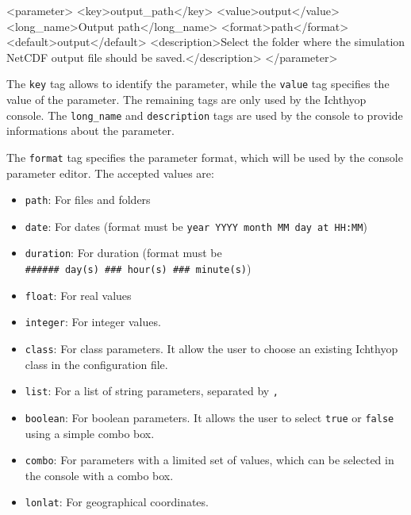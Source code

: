 \documentclass[
  letterpaper,
  DIV=11,
  numbers=noendperiod]{scrreprt}
\newenvironment{Shaded}{\begin{snugshade}}{\end{snugshade}}
\newcommand{\KeywordTok}[1]{\textcolor[rgb]{0.00,0.23,0.31}{#1}}
\newcommand{\NormalTok}[1]{\textcolor[rgb]{0.00,0.23,0.31}{#1}}
\providecommand{\tightlist}{%
  \setlength{\itemsep}{0pt}\setlength{\parskip}{0pt}}\usepackage{longtable,booktabs,array}
\begin{document}
\begin{Shaded}
\begin{Highlighting}[]
\NormalTok{\textless{}}\KeywordTok{parameter}\NormalTok{\textgreater{}}
\NormalTok{    \textless{}}\KeywordTok{key}\NormalTok{\textgreater{}output\_path\textless{}/}\KeywordTok{key}\NormalTok{\textgreater{}}
\NormalTok{    \textless{}}\KeywordTok{value}\NormalTok{\textgreater{}output\textless{}/}\KeywordTok{value}\NormalTok{\textgreater{}}
\NormalTok{    \textless{}}\KeywordTok{long\_name}\NormalTok{\textgreater{}Output path\textless{}/}\KeywordTok{long\_name}\NormalTok{\textgreater{}}
\NormalTok{    \textless{}}\KeywordTok{format}\NormalTok{\textgreater{}path\textless{}/}\KeywordTok{format}\NormalTok{\textgreater{}}
\NormalTok{    \textless{}}\KeywordTok{default}\NormalTok{\textgreater{}output\textless{}/}\KeywordTok{default}\NormalTok{\textgreater{}}
\NormalTok{    \textless{}}\KeywordTok{description}\NormalTok{\textgreater{}Select the folder where the simulation NetCDF output file should be saved.\textless{}/}\KeywordTok{description}\NormalTok{\textgreater{}}
\NormalTok{\textless{}/}\KeywordTok{parameter}\NormalTok{\textgreater{}}
\end{Highlighting}
\end{Shaded}

The \texttt{key} tag allows to identify the parameter, while the
\texttt{value} tag specifies the value of the parameter. The remaining
tags are only used by the Ichthyop console. The \texttt{long\_name} and
\texttt{description} tags are used by the console to provide
informations about the parameter.

The \texttt{format} tag specifies the parameter format, which will be
used by the console parameter editor. The accepted values are:

\begin{itemize}
\tightlist
\item
  \texttt{path}: For files and folders
\item
  \texttt{date}: For dates (format must be
  \texttt{year\ YYYY\ month\ MM\ day\ at\ HH:MM})
\item
  \texttt{duration}: For duration (format must be
  \texttt{\#\#\#\#\#\#\ day(s)\ \#\#\#\ hour(s)\ \#\#\#\ minute(s)})
\item
  \texttt{float}: For real values
\item
  \texttt{integer}: For integer values.
\item
  \texttt{class}: For class parameters. It allow the user to choose an
  existing Ichthyop class in the configuration file.
\item
  \texttt{list}: For a list of string parameters, separated by
  \texttt{,}
\item
  \texttt{boolean}: For boolean parameters. It allows the user to select
  \texttt{true} or \texttt{false} using a simple combo box.
\item
  \texttt{combo}: For parameters with a limited set of values, which can
  be selected in the console with a combo box.
\item
  \texttt{lonlat}: For geographical coordinates.
\end{itemize}
\end{document}
